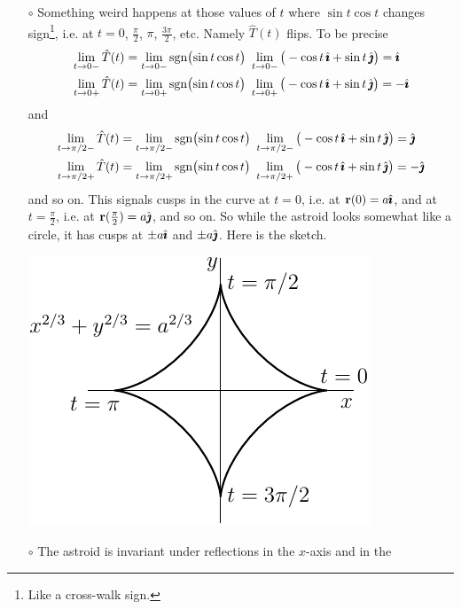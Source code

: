 \begin{eg}
\begin{itemize}
\item[$\circ$]
Something weird happens at those values of $t$ where $\sin t\cos t$ changes sign\footnote{Like a cross-walk sign.},
i.e. at $t=0$, $\frac{\pi}{2}$, $\pi$, $\frac{3\pi}{2}$, etc. Namely $\hat T(t)$ 
flips. To be precise
\begin{align*}
\lim_{t\rightarrow 0-}\hat T(t) 
&=\lim_{t\rightarrow 0-}  \sgn\!\big(\!\sin t\cos t\big)\   
         \lim_{t\rightarrow 0-}\big(-\cos t\,\hi+\sin t\,\hj\big)
= \hi \\
\lim_{t\rightarrow 0+}\hat T(t) 
&= \lim_{t\rightarrow 0+}\sgn\!\big(\!\sin t\cos t\big)\ 
\lim_{t\rightarrow 0+}\big(-\cos t\,\hi+\sin t\,\hj\big)
=-\hi \\
\end{align*}
and 
\begin{align*}
\lim_{t\rightarrow \pi/2-}\hat T(t) 
&= \lim_{t\rightarrow \pi/2-}\sgn\!\big(\!\sin t\cos t\big)\ 
\lim_{t\rightarrow \pi/2-}\big(-\cos t\,\hi+\sin t\,\hj\big)
=\hj \\
\lim_{t\rightarrow \pi/2+}\hat T(t) 
&= \lim_{t\rightarrow \pi/2+}\sgn\!\big(\!\sin t\cos t\big)\ 
\lim_{t\rightarrow \pi/2+}\big(-\cos t\,\hi+\sin t\,\hj\big)
=-\hj 
\end{align*}
and so on. This signals cusps in the curve at $t=0$, i.e. at $\mathbf{r}(0) = a\hat{\pmb{\imath}}$,
and at $t=\frac{\pi}{2}$, i.e. at $\mathbf{r}(\frac{\pi}{2}) = a\hat{\pmb{\jmath}}$, and so on. So
while the astroid looks somewhat like a circle, it has cusps at $\pm a\hat{\pmb{\imath}}$ and $\pm a\hat{\pmb{\jmath}}$. Here is the sketch.
\begin{efig}
\begin{center}
     \includegraphics{astroid4.pdf}
\end{center}
\end{efig}
\item[$\circ$] The astroid is invariant under reflections in the $x$-axis and in the 

\end{itemize}
\end{eg}
